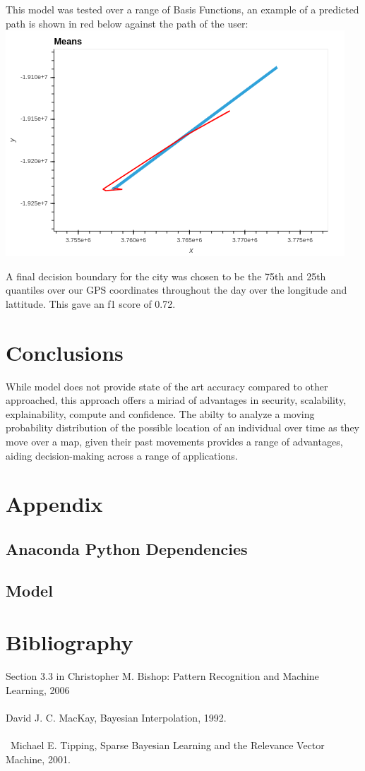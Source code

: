 \documentclass[12pt]{report}
\begin{document}
This model was tested over a range of Basis Functions, an example of a predicted path is shown in red below against the path of the user:  \\
\includegraphics[scale=1]{./images/bokeh_plot_(5).png}

A final decision boundary for the city was chosen to be the 75th and 25th quantiles over our GPS coordinates throughout the day over the longitude and lattitude.  This gave an f1 score of 0.72.  \\

\section{Conclusions}
While model does not provide state of the art accuracy compared to other approached, this approach offers a miriad of advantages in security, scalability, explainability, compute and confidence.  The abilty to analyze a moving probability distribution of the possible location of an individual over time as they move over a map, given their past movements provides a range of advantages, aiding decision-making across a range of applications.  \\

\newpage
\appendix
\section{Appendix}
\subsection{Anaconda Python Dependencies}

\subsection{Model}



\section{Bibliography}
Section 3.3 in Christopher M. Bishop: Pattern Recognition and Machine Learning, 2006\\
\\
David J. C. MacKay, Bayesian Interpolation, 1992.\\
\\\
Michael E. Tipping, Sparse Bayesian Learning and the Relevance Vector Machine, 2001.\\
\end{document}
